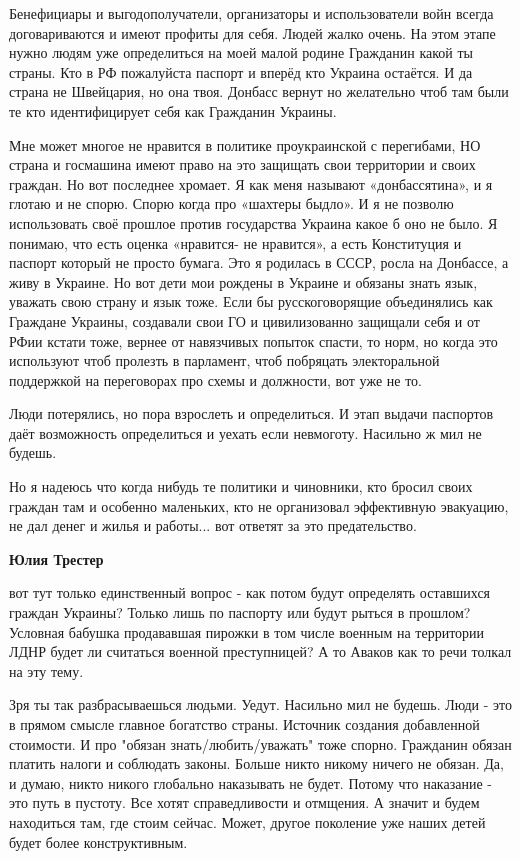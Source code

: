 \begin{itemize}

Бенефициары и выгодополучатели, организаторы и использователи войн всегда
договариваются и имеют профиты для себя. Людей жалко очень. На этом этапе нужно
людям уже определиться на моей малой родине Гражданин какой ты страны. Кто в РФ
пожалуйста паспорт и вперёд кто Украина остаётся. И да страна не Швейцария, но
она твоя. Донбасс вернут но желательно чтоб там были те кто идентифицирует себя
как Гражданин Украины. 

Мне может многое не нравится в политике проукраинской с перегибами, НО страна и
госмашина имеют право на это защищать свои территории и своих граждан. Но вот
последнее хромает. Я как меня называют «донбассятина», и я глотаю и не спорю.
Спорю когда про «шахтеры быдло». И я не позволю использовать своё прошлое
против государства Украина какое б оно не было. Я понимаю, что есть оценка
«нравится- не нравится», а есть Конституция и паспорт который не просто бумага.
Это я родилась в СССР, росла на Донбассе, а живу в Украине. Но вот дети мои
рождены в Украине и обязаны знать язык, уважать свою страну и язык тоже. Если
бы русскоговорящие объединялись как Граждане Украины, создавали свои ГО и
цивилизованно защищали себя и от РФии кстати тоже, вернее от навязчивых попыток
спасти, то норм, но когда это используют чтоб пролезть в парламент, чтоб
побряцать электоральной поддержкой на переговорах про схемы и должности, вот
уже не то. 

Люди потерялись, но пора взрослеть и определиться. И этап выдачи паспортов даёт
возможность определиться и уехать если невмоготу.  Насильно ж мил не будешь. 

Но я надеюсь что когда нибудь те политики и чиновники, кто бросил своих граждан
там и особенно маленьких, кто не организовал эффективную эвакуацию, не дал
денег и жилья и работы... вот ответят за это предательство.

\begin{itemize} %
\textbf{Юлия Трестер} 

вот тут только единственный вопрос - как потом будут определять оставшихся
граждан Украины? Только лишь по паспорту или будут рыться в прошлом? Условная
бабушка продававшая пирожки в том числе военным на территории ЛДНР будет ли
считаться военной преступницей? А то Аваков как то речи толкал на эту тему.


Зря ты так разбрасываешься людьми. Уедут. Насильно мил не будешь. Люди - это в
прямом смысле главное богатство страны. Источник создания добавленной
стоимости. И про "обязан знать/любить/уважать" тоже спорно. Гражданин обязан
платить налоги и соблюдать законы. Больше никто никому ничего не обязан. Да, и
думаю, никто никого глобально наказывать не будет. Потому что наказание - это
путь в пустоту. Все хотят справедливости и отмщения. А значит и будем
находиться там, где стоим сейчас. Может, другое поколение уже наших детей будет
более конструктивным.


\end{itemize}
\end{itemize}
